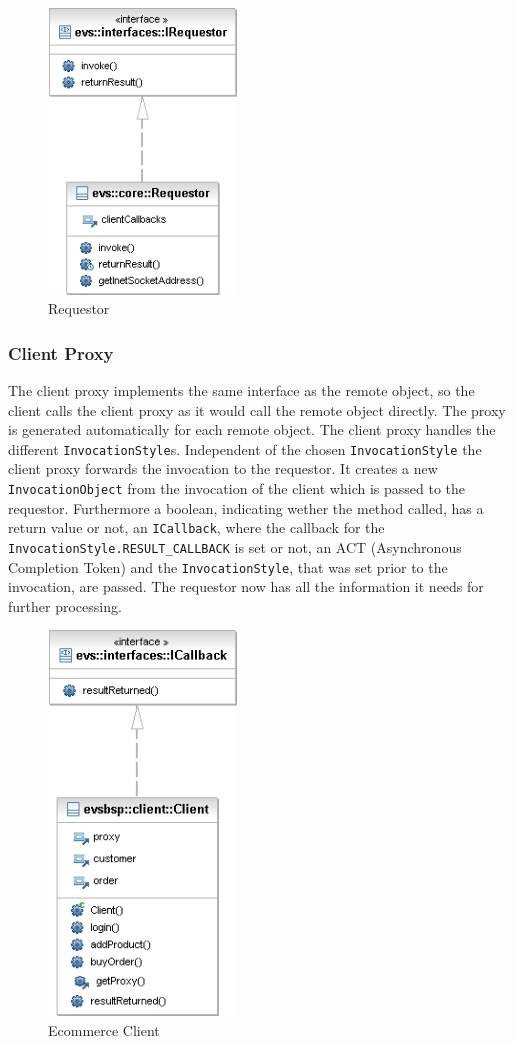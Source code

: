 \begin{figure}[ht!]
	\centering\includegraphics[width=5cm]{uml/Requestor.jpg} 
	\caption{Requestor}
	\label{fig:requestor}
\end{figure}

\subsubsection{Client Proxy}

The client proxy implements the same interface as the remote object, so the client calls the client proxy as it would call the remote object directly. The proxy is generated automatically for each remote object. The client proxy handles the different \texttt{InvocationStyle}s. Independent of the chosen \texttt{InvocationStyle} the client proxy forwards the invocation to the requestor. It creates a new \texttt{InvocationObject} from the invocation of the client which is passed to the requestor. Furthermore a boolean, indicating wether the method called, has a return value or not, an \texttt{ICallback}, where the callback for the \texttt{InvocationStyle.RESULT\_CALLBACK} is set or not, an ACT (Asynchronous Completion Token) and the \texttt{InvocationStyle}, that was set prior to the invocation, are passed. The requestor now has all the information it needs for further processing.

\begin{figure}[ht!]
	\centering\includegraphics[width=5cm]{uml/Client.jpg} 
	\caption{Ecommerce Client}
	\label{fig:client}
\end{figure}



